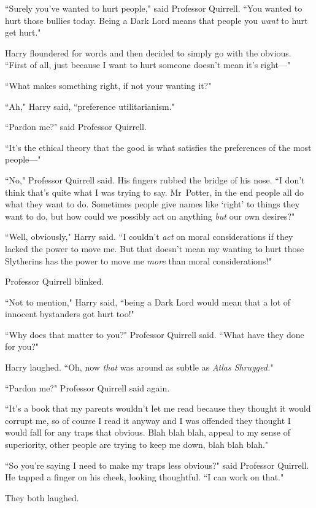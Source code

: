 ``Surely you've wanted to hurt people," said Professor Quirrell. ``You wanted to hurt those bullies today. Being a Dark Lord means that people you \emph{want} to hurt get hurt."

Harry floundered for words and then decided to simply go with the obvious. ``First of all, just because I want to hurt someone doesn't mean it's right—"

``What makes something right, if not your wanting it?"

``Ah," Harry said, ``preference utilitarianism."

``Pardon me?" said Professor Quirrell.

``It's the ethical theory that the good is what satisfies the preferences of the most people—"

``No," Professor Quirrell said. His fingers rubbed the bridge of his nose. ``I don't think that's quite what I was trying to say. Mr~Potter, in the end people all do what they want to do. Sometimes people give names like `right' to things they want to do, but how could we possibly act on anything \emph{but} our own desires?"

``Well, obviously," Harry said. ``I couldn't \emph{act} on moral considerations if they lacked the power to move me. But that doesn't mean my wanting to hurt those Slytherins has the power to move me \emph{more} than moral considerations!"

Professor Quirrell blinked.

``Not to mention," Harry said, ``being a Dark Lord would mean that a lot of innocent bystanders got hurt too!"

``Why does that matter to you?" Professor Quirrell said. ``What have they done for you?"

Harry laughed. ``Oh, now \emph{that} was around as subtle as \emph{Atlas Shrugged.}"

``Pardon me?" Professor Quirrell said again.

``It's a book that my parents wouldn't let me read because they thought it would corrupt me, so of course I read it anyway and I was offended they thought I would fall for any traps that obvious. Blah blah blah, appeal to my sense of superiority, other people are trying to keep me down, blah blah blah."

``So you're saying I need to make my traps less obvious?" said Professor Quirrell. He tapped a finger on his cheek, looking thoughtful. ``I can work on that."

They both laughed.

